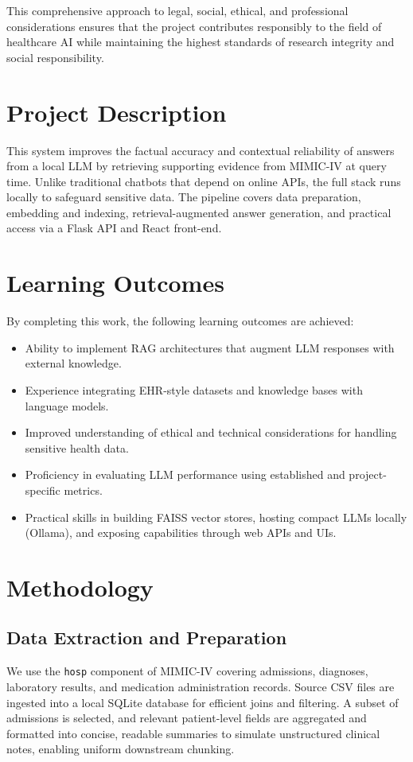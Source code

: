 This comprehensive approach to legal, social, ethical, and professional considerations ensures that the project contributes responsibly to the field of healthcare AI while maintaining the highest standards of research integrity and social responsibility.
\newpage
\section{Project Description}
This system improves the factual accuracy and contextual reliability of answers from a local LLM by retrieving supporting evidence from MIMIC-IV at query time. Unlike traditional chatbots that depend on online APIs, the full stack runs locally to safeguard sensitive data. The pipeline covers data preparation, embedding and indexing, retrieval-augmented answer generation, and practical access via a Flask API and React front-end.

\section{Learning Outcomes}
By completing this work, the following learning outcomes are achieved:
\begin{itemize}
  \item Ability to implement RAG architectures that augment LLM responses with external knowledge.
  \item Experience integrating EHR-style datasets and knowledge bases with language models.
  \item Improved understanding of ethical and technical considerations for handling sensitive health data.
  \item Proficiency in evaluating LLM performance using established and project-specific metrics.
  \item Practical skills in building FAISS vector stores, hosting compact LLMs locally (Ollama), and exposing capabilities through web APIs and UIs.
\end{itemize}

\section{Methodology}
\subsection{Data Extraction and Preparation}
We use the \texttt{hosp} component of MIMIC-IV covering admissions, diagnoses, laboratory results, and medication administration records. Source CSV files are ingested into a local SQLite database for efficient joins and filtering. A subset of admissions is selected, and relevant patient-level fields are aggregated and formatted into concise, readable summaries to simulate unstructured clinical notes, enabling uniform downstream chunking.

